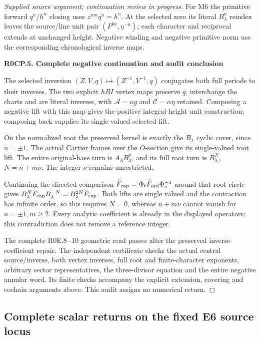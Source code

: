 \begin{proof}[Supplied source argument; continuation review in progress]
For M6 the primitive forward \(q^n/h^n\) closing uses
\(z^{nm}q^n=h^n\). At the selected zero its literal
\(B_\lambda^n\) reindex leaves the source/line unit pair
\((P^{bn},\eta^{-n})\); each character and reciprocal extends
at unchanged height. Negative winding and negative primitive norm
use the corresponding chronological inverse maps.

\par

\medskip\noindent\textbf{R0CP.5. Complete negative continuation and audit conclusion}

\par\nobreak

The selected inversion \((Z,V,q)\mapsto(Z^{-1},V^{-1},q)\)
conjugates both full periods to their inverses. The two explicit
\(hBI\) vertex maps preserve \(q\), interchange the charts and
are literal inverses, with \(\mathcal A=\kappa g\) and
\(\mathcal C=\alpha\eta\) retained. Composing a negative lift
with this map gives the positive integral-height unit construction;
composing back supplies its single-valued selected lift.

On the normalized root the preserved kernel is exactly the
\(B_\lambda\) cyclic cover, since \(n=\pm1\). The actual Cartier
frames over the \(O\)-section give its single-valued root lift.
The entire original-base turn is \(A_\lambda B_\lambda^\nu\),
and its full root turn is \(B_\lambda^N\),
\(N=n+m\nu\). The integer \(\nu\) remains unrestricted.

Continuing the directed comparison
\(\widetilde F_{\rm cap}=\Phi_t\widetilde F_{\rm ord}\Phi_s^{-1}\)
around that root circle gives
\(B_\lambda^N\widetilde F_{\rm cap}B_\lambda^{-N}
=B_\lambda^{2N}\widetilde F_{\rm cap}\).
Both lifts are single valued and the contraction has infinite
order, so this requires \(N=0\), whereas
\(n+m\nu\) cannot vanish for \(n=\pm1,m\geq2\).
Every analytic coefficient is already in the displayed operators;
this contradiction does not remove a reference integer.

The complete R0E.8-\/-10 geometric read passes after the preserved
inverse-coefficient repair. The independent certificate checks the
actual central source/inverse, both vertex inverses, full root and
finite-character exponents, arbitrary sector representatives,
the three-divisor equation and the entire negative annular word.
Its finite checks accompany the explicit extension, covering and
cochain arguments above. This audit assigns no numerical return.


\end{proof}


\subsection{Complete scalar returns on the fixed E6 source locus}
